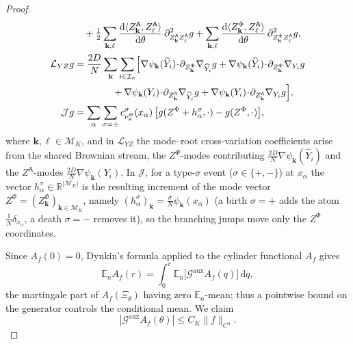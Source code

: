 \documentclass[a4paper,fleqn]{cas-sc}
\theoremstyle{definition}
\theoremstyle{remark}
\begin{document}
\begin{proof}
\begin{equation}
\begin{aligned}
&\quad+\tfrac12\sum_{\mathbf k,\ell}\frac{\mathrm d\langle Z^{\mathsf A}_{\mathbf k},Z^{\mathsf A}_\ell\rangle}{\mathrm d\theta}\,\partial^2_{Z^{\mathsf A}_{\mathbf k}Z^{\mathsf A}_\ell}g
+\sum_{\mathbf k,\ell}\frac{\mathrm d\langle Z^\Phi_{\mathbf k},Z^{\mathsf A}_\ell\rangle}{\mathrm d\theta}\,\partial^2_{Z^\Phi_{\mathbf k}Z^{\mathsf A}_\ell}g,\\
\mathcal L_{YZ}g&=\frac{2D}{N}\sum_{\mathbf k}\sum_{i\in\mathcal I_n}\Bigl[
\nabla\psi_{\mathbf k}(\widehat Y_i)\!\cdot\!\partial_{Z^\Phi_{\mathbf k}}\nabla_{\widehat Y_i}g
+\nabla\psi_{\mathbf k}(\widehat Y_i)\!\cdot\!\partial_{Z^\Phi_{\mathbf k}}\nabla_{Y_i}g\\
&\qquad\qquad+\nabla\psi_{\mathbf k}(Y_i)\!\cdot\!\partial_{Z^{\mathsf A}_{\mathbf k}}\nabla_{\widehat Y_i}g
+\nabla\psi_{\mathbf k}(Y_i)\!\cdot\!\partial_{Z^{\mathsf A}_{\mathbf k}}\nabla_{Y_i}g\Bigr],\\
\mathcal Jg&=\sum_{\alpha}\sum_{\sigma=\pm}c^\sigma_{\nu^\Phi_\theta}(x_\alpha)\,
\bigl[g(Z^\Phi+h^\sigma_\alpha,\cdot)-g(Z^\Phi,\cdot)\bigr],
\end{aligned}
\end{equation}
where $\mathbf k,\ell\in\mathcal M_K$, and in $\mathcal L_{YZ}$ the mode--root
cross-variation coefficients arise from the shared Brownian stream, the $Z^\Phi$-modes
contributing $\tfrac{2D}N\nabla\psi_{\mathbf k}(\widehat Y_i)$ and the $Z^{\mathsf A}$-modes
$\tfrac{2D}N\nabla\psi_{\mathbf k}(Y_i)$. In $\mathcal J$, for a type-$\sigma$ event
($\sigma\in\{+,-\}$) at $x_\alpha$ the vector $h^\sigma_\alpha\in\mathbb R^{|\mathcal M_K|}$
is the resulting increment of the mode vector
$Z^\Phi=(Z^\Phi_{\mathbf k})_{\mathbf k\in\mathcal M_K}$, namely
$(h^\sigma_\alpha)_{\mathbf k}=\tfrac{\sigma}N\psi_{\mathbf k}(x_\alpha)$ (a birth $\sigma=+$
adds the atom $\tfrac1N\delta_{x_\alpha}$, a death $\sigma=-$ removes it), so the branching
jumps move only the $Z^\Phi$ coordinates. 

Since $A_f(0)=0$, Dynkin's formula applied to the cylinder functional $A_f$ gives
\begin{equation}\label{eq:L4-dynkin}
\mathbb E_nA_f(r)=\int_0^r\mathbb E_n\bigl[\mathcal G^{\mathrm{aux}}A_f(q)\bigr]\,\mathrm dq,
\end{equation}
the martingale part of $A_f(\Xi_\theta)$ having zero $\mathbb E_n$-mean; thus a pointwise bound
on the generator controls the conditional mean. We claim
\begin{equation}\label{eq:L4-gen}
|\mathcal G^{\mathrm{aux}}A_f(\theta)|\le C_K\|f\|_{C^4}.
\end{equation}


\end{proof}
\end{document}
